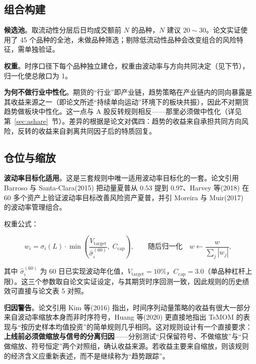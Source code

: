 \subsection{组合构建}

\textbf{候选池}。取流动性分层后日均成交额前 $N$ 的品种，$N$ 建议 $20\sim30$。论文实证使用了 45 个品种的全池，未做品种筛选；剔除低流动性品种会改变组合的风险特征，需单独验证。

\textbf{权重}。时序口径下每个品种独立建仓，权重由波动率与方向共同决定（见下节），归一化使总敞口为 1。

\textbf{为何不做行业中性化}。期货的“行业”即产业链，趋势策略在产业链内的同向暴露是其收益来源之一（即论文所述“持续单向运动”环境下的板块共振），因此不对期货趋势做板块中性化。这一点与 A 股反转规则相反——那里必须做中性化（详见第~\ref{sec:ashare}~节）。差异的根据是论文对偶四：趋势的收益来自承担共同方向风险，反转的收益来自剥离共同因子后的特质回复。

\subsection{仓位与缩放}

\textbf{波动率目标化适用}。这是三套规则中唯一适用波动率目标化的一套。论文引用 Barroso 与 Santa-Clara(2015) 把动量夏普从 $0.53$ 提到 $0.97$、Harvey 等(2018) 在 60 多个资产上验证波动率目标改善风险资产夏普\cite{barroso2015,harvey2018}，并引 Moreira 与 Muir(2017) 的波动率管理组合\cite{moreiramuir2017}。

权重公式：

\begin{equation}
w_i=\sigma_i(L)\cdot\min\left(\frac{V_{\text{target}}}{\hat\sigma_i^{(60)}},\;C_{\text{cap}}\right),
\qquad\text{随后归一化}\quad w\leftarrow\frac{w}{\sum_j|w_j|},
\end{equation}

其中 $\hat\sigma_i^{(60)}$ 为 60 日已实现波动年化值，$V_{\text{target}}=10\%$，$C_{\text{cap}}=3.0$（单品种杠杆上限）。这三个参数取自论文实证设定，与其期货时序回测一致，因此规则的历史绩效可直接与论文表 5 对照。

\textbf{归因警告}。论文引用 Kim 等(2016) 指出，时间序列动量策略的收益有很大一部分来自波动率缩放本身而非时序符号\cite{kim2016}，Huang 等(2020) 更直接地指出 TsMOM 的表现与“按历史样本均值投资”的简单规则几乎相同\cite{huang2020}。这对规则设计有一个直接要求：\textbf{上线前必须做缩放与信号的分离归因}——分别测试“只保留符号、不做缩放”与“只做缩放、符号恒定”两个对照组，确认收益来源。若收益主要来自缩放，则该规则的经济含义应重新表述，而不是继续称为“趋势跟踪”。

